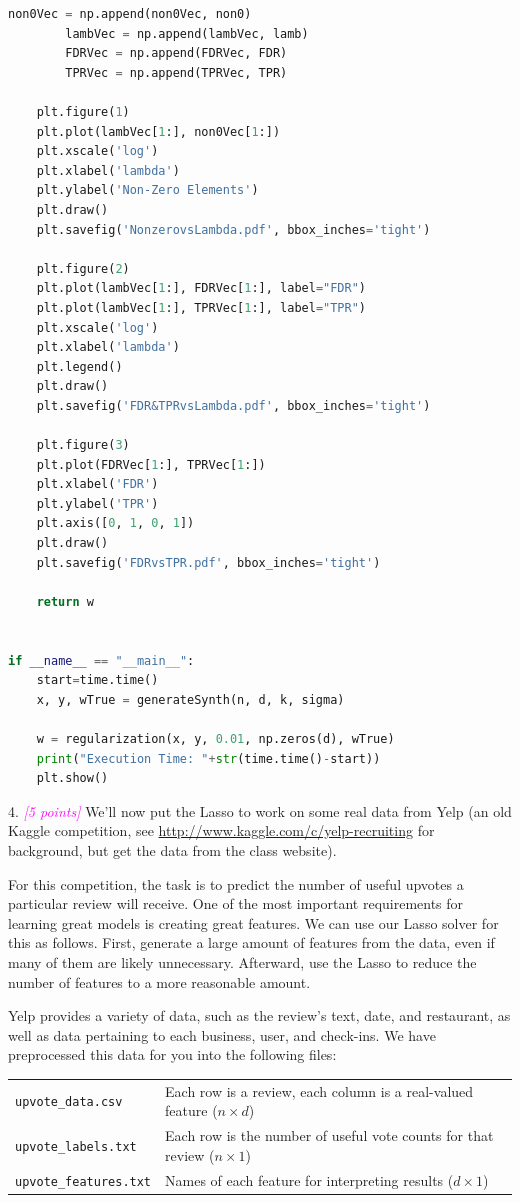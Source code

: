 \documentclass{article}
\newcommand{\1}{\mathbf{1}}
\newcommand{\grade}[1]{\small\textcolor{magenta}{\emph{[#1 points]}} \normalsize}
\begin{document}
\begin{lstlisting}[language=Python]
        non0Vec = np.append(non0Vec, non0)
        lambVec = np.append(lambVec, lamb)
        FDRVec = np.append(FDRVec, FDR)
        TPRVec = np.append(TPRVec, TPR)

    plt.figure(1)
    plt.plot(lambVec[1:], non0Vec[1:])
    plt.xscale('log')
    plt.xlabel('lambda')
    plt.ylabel('Non-Zero Elements')
    plt.draw()
    plt.savefig('NonzerovsLambda.pdf', bbox_inches='tight')

    plt.figure(2)
    plt.plot(lambVec[1:], FDRVec[1:], label="FDR")
    plt.plot(lambVec[1:], TPRVec[1:], label="TPR")
    plt.xscale('log')
    plt.xlabel('lambda')
    plt.legend()
    plt.draw()
    plt.savefig('FDR&TPRvsLambda.pdf', bbox_inches='tight')

    plt.figure(3)
    plt.plot(FDRVec[1:], TPRVec[1:])
    plt.xlabel('FDR')
    plt.ylabel('TPR')
    plt.axis([0, 1, 0, 1])
    plt.draw()
    plt.savefig('FDRvsTPR.pdf', bbox_inches='tight')

    return w


if __name__ == "__main__":
    start=time.time()
    x, y, wTrue = generateSynth(n, d, k, sigma)

    w = regularization(x, y, 0.01, np.zeros(d), wTrue)
    print("Execution Time: "+str(time.time()-start))
    plt.show()
\end{lstlisting}

4. \grade{5} We'll now put the Lasso to work on some real data from Yelp (an old Kaggle competition, see \url{http://www.kaggle.com/c/yelp-recruiting} for background, but get the data from the class website).

For this competition, the task is to predict the number of useful upvotes a particular review will receive. 
One of the most important requirements for learning great models is creating great features.  
We can use our Lasso solver for this as follows.  First, generate a large amount of features from the data, even if many of them are likely unnecessary.  Afterward, use the Lasso to reduce the number of features to a more reasonable amount. 

Yelp provides a variety of data, such as the review's text, date, and restaurant, 
as well as data pertaining to each business, user, and check-ins.  We have preprocessed this data for you into the following files:

\begin{center}
\begin{tabular}{l l}
\texttt{upvote\_data.csv} & Each row is a review, each column is a real-valued feature ($ n\times d$)  \\
\texttt{upvote\_labels.txt} &  Each row is the number of useful vote counts for that review ($n \times 1$)\\
\texttt{upvote\_features.txt} & Names of each feature for interpreting results ($d\times 1$)
\end{tabular}
\end{center}
\end{document}

